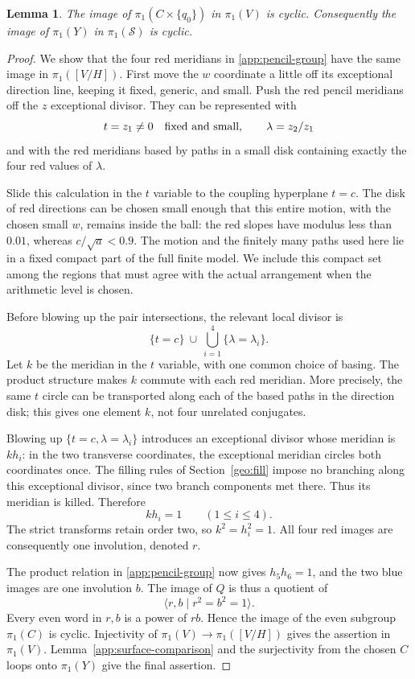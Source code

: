 \documentclass[11pt,reqno]{amsart}
\numberwithin{equation}{section}
\newtheorem{lemma}[theorem]{Lemma}
\theoremstyle{definition}
\theoremstyle{remark}
\newcommand{\cS}{\mathcal S}
\begin{document}
\begin{lemma}\label{app:cyclic-upper}
The image of $\pi_1(C\times\{q_0\})$ in $\pi_1(V)$ is cyclic.
Consequently the image of $\pi_1(Y)$ in $\pi_1(\cS)$ is cyclic.
\end{lemma}

\begin{proof}
We show that the four red meridians in \eqref{app:pencil-group} have
the same image in $\pi_1([V/H])$.  First move the $w$ coordinate a little
off its exceptional direction line, keeping it fixed, generic, and
small.  Push the red pencil meridians off the $z$ exceptional divisor.
They can be represented with
\[
 t=z_1\ne0\quad\hbox{fixed and small},\qquad
 \lambda=z_2/z_1
\]
and with the red meridians based by paths in a small disk containing
exactly the four red values of $\lambda$.

Slide this calculation in the $t$ variable to the coupling hyperplane
$t=c$.  The disk of red directions can be chosen small enough that
this entire motion, with the chosen small $w$, remains inside the
ball: the red slopes have modulus less than $0.01$, whereas
$c/\sqrt a<0.9$.  The motion and the finitely many paths used here lie
in a fixed compact part of the full finite model.  We include this
compact set among the regions that must agree with the actual
arrangement when the arithmetic level is chosen.

Before blowing up the pair intersections, the relevant local divisor
is
\[
 \{t=c\}\ \cup\ \bigcup_{i=1}^4\{\lambda=\lambda_i\}.
\]
Let $k$ be the meridian in the $t$ variable, with one common choice of
basing.  The product structure makes $k$ commute with each red
meridian.  More precisely, the same $t$ circle can be transported along
each of the based paths in the direction disk; this gives one element
$k$, not four unrelated conjugates.

Blowing up $\{t=c,\lambda=\lambda_i\}$ introduces an exceptional
divisor whose meridian is $kh_i$: in the two transverse coordinates,
the exceptional meridian circles both coordinates once.  The filling
rules of Section~\ref{geo:fill} impose no branching along this
exceptional divisor, since two branch components met there.  Thus its
meridian is killed.  Therefore
\[
 kh_i=1\qquad(1\le i\le4).
\]
The strict transforms retain order two, so $k^2=h_i^2=1$.  All four
red images are consequently one involution, denoted $r$.

The product relation in \eqref{app:pencil-group} now gives
$h_5h_6=1$, and the two blue images are one involution $b$.  The image
of $Q$ is thus a quotient of
\[
 \langle r,b\mid r^2=b^2=1\rangle.
\]
Every even word in $r,b$ is a power of $rb$.  Hence the image of the
even subgroup $\pi_1(C)$ is cyclic.  Injectivity of
$\pi_1(V)\to\pi_1([V/H])$ gives the assertion in $\pi_1(V)$.
Lemma~\ref{app:surface-comparison} and the surjectivity from the chosen
$C$ loops onto $\pi_1(Y)$ give the final assertion.
\end{proof}
\end{document}
